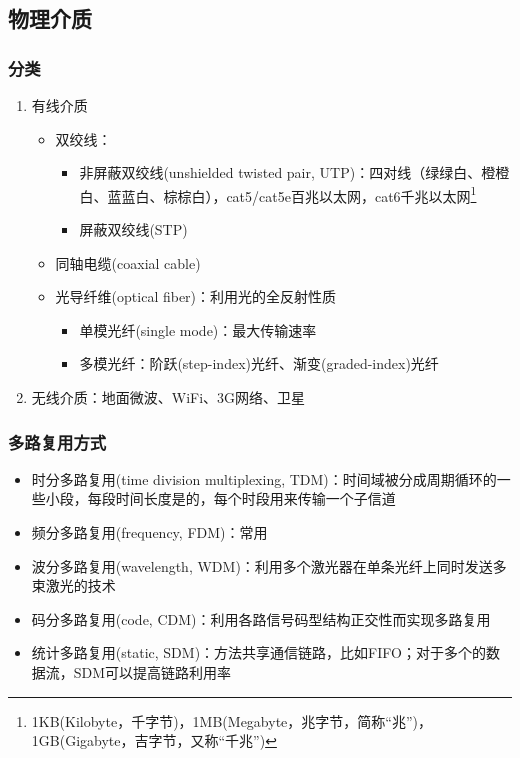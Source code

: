 \subsection{物理介质}
\subsubsection{分类}
\begin{enumerate}
\item 有线介质
\begin{itemize}
	\item 双绞线：
	\begin{itemize}
		\item 非屏蔽双绞线(unshielded twisted pair, UTP)：四对线（绿绿白、橙橙白、蓝蓝白、棕棕白），cat5/cat5e百兆以太网，cat6千兆以太网\footnote{1KB(Kilobyte，千字节)，1MB(Megabyte，兆字节，简称``兆'')，1GB(Gigabyte，吉字节，又称``千兆'')}
		\item 屏蔽双绞线(STP)
	\end{itemize}
	\item 同轴电缆(coaxial cable)
	\item 光导纤维(optical fiber)：利用光的全反射性质
	\begin{itemize}
		\item 单模光纤(single mode)：最大传输速率
		\item 多模光纤：阶跃(step-index)光纤、渐变(graded-index)光纤
	\end{itemize}
\end{itemize}
\item 无线介质：地面微波、WiFi、3G网络、卫星
\end{enumerate}

\subsubsection{多路复用方式}
\begin{itemize}
	\item 时分多路复用(time division multiplexing, TDM)：时间域被分成周期循环的一些小段，每段时间长度是的，每个时段用来传输一个子信道
	\item 频分多路复用(frequency, FDM)：常用
	\item 波分多路复用(wavelength, WDM)：利用多个激光器在单条光纤上同时发送多束激光的技术
	\item 码分多路复用(code, CDM)：利用各路信号码型结构正交性而实现多路复用
	\item 统计多路复用(static, SDM)：方法共享通信链路，比如FIFO；对于多个的数据流，SDM可以提高链路利用率
\end{itemize}

